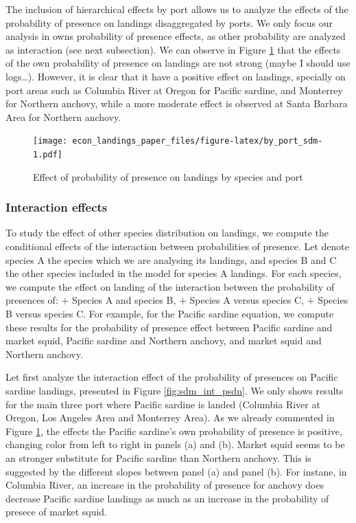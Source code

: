 \documentclass[
]{article}
\begin{document}
The inclusion of hierarchical effects by port allows us to analyze the
effects of the probability of presence on landings disaggregated by
ports. We only focus our analysis in owns probability of presence
effects, as other probability are analyzed as interaction (see next
subsection). We can observe in Figure \ref{fig:sdmeffects} that the
effects of the own probability of presence on landings are not strong
(maybe I should use logs\ldots). However, it is clear that it have a
positive effect on landings, specially on port areas such as Columbia
River at Oregon for Pacific sardine, and Monterrey for Northern anchovy,
while a more moderate effect is observed at Santa Barbara Area for
Northern anchovy.

\begin{figure}
\centering
\texttt{[image: econ\_landings\_paper\_files/figure-latex/by\_port\_sdm-1.pdf]}
\caption{Effect of probability of presence on landings by species and
port\label{fig:sdmeffects}}
\end{figure}

\hypertarget{interaction-effects}{%
\subsubsection{Interaction effects}\label{interaction-effects}}

To study the effect of other species distribution on landings, we
compute the conditional effects of the interaction between probabilities
of presence. Let denote species A the species which we are analysing its
landings, and species B and C the other species included in the model
for species A landings. For each species, we compute the effect on
landing of the interaction between the probability of presences of: +
Species A and species B, + Species A versus species C, + Species B
versus species C. For example, for the Pacific sardine equation, we
compute these results for the probability of presence effect between
Pacific sardine and market squid, Pacific sardine and Northern anchovy,
and market squid and Northern anchovy.

Let first analyze the interaction effect of the probability of presences
on Pacific sardine landings, presented in Figure \ref{fig:sdm_int_psdn}.
We only shows results for the main three port where Pacific sardine is
landed (Columbia River at Oregon, Los Angeles Area and Monterrey Area).
As we already commented in Figure \ref{fig:sdmeffects}, the effects the
Pacific sardine's own probability of presence is positive, changing
color from left to right in panels (a) and (b). Market squid seems to be
an stronger substitute for Pacific sardine than Northern anchovy. This
is suggested by the different slopes between panel (a) and panel (b).
For instane, in Columbia River, an increase in the probability of
presence for anchovy does decrease Pacific sardine landings as much as
an increase in the probability of presece of market squid.
\end{document}
